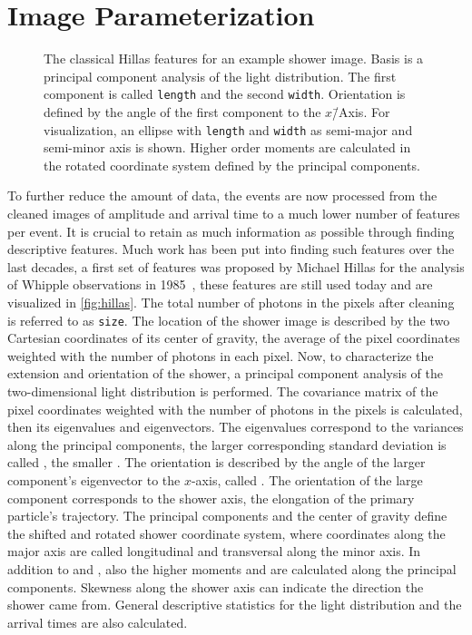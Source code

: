 \section{Image Parameterization}\label{sec:parameters}
\begin{figure}
  \begin{captionbeside}{%
    The classical Hillas features for an example shower image.
    Basis is a principal component analysis of the light distribution. 
    The first component is called \texttt{length} and the second \texttt{width}.
    Orientation is defined by the angle of the first component to the $x$\=/Axis.
    For visualization, an ellipse with \texttt{length} and \texttt{width} as  
    semi-major and semi-minor axis is shown.
    Higher order moments are calculated in the rotated coordinate system defined
    by the principal components.
  }%
  \end{captionbeside}\label{fig:hillas}
\end{figure}
\noindent To further reduce the amount of data,
the events are now processed from the cleaned images of amplitude and arrival time to a much lower number of features per event.
It is crucial to retain as much information as possible through finding 
descriptive features.
Much work has been put into finding such features over the last decades, 
a first set of features was proposed by Michael Hillas for the analysis of Whipple
observations in 1985~\cite{hillas}, these features are still used today and are visualized
in \autoref{fig:hillas}.
The total number of photons in the pixels after cleaning is referred to as \texttt{size}.
The location of the shower image is described by the two Cartesian coordinates of its center of gravity, the average of the pixel coordinates weighted with the number of photons in each pixel.
Now, to characterize the extension and orientation of the shower, a principal component
analysis of the two-dimensional light distribution is performed.
The covariance matrix of the pixel coordinates weighted with the number of photons
in the pixels is calculated, then its eigenvalues and eigenvectors.
The eigenvalues correspond to the variances along the principal components,
the larger corresponding standard deviation is called , the smaller .
The orientation is described by the angle of the larger component's eigenvector 
to the $x$-axis, called .
The orientation of the large component corresponds to the shower axis,
the elongation of the primary particle's trajectory.
The principal components and the center of gravity define the shifted and rotated shower coordinate system,
where coordinates along the major axis are called longitudinal and transversal along the minor axis.  
In addition to  and ,
also the higher moments  and  are calculated
along the principal components.
Skewness along the shower axis can indicate the direction the shower came from.
General descriptive statistics for the light distribution and the arrival times
are also calculated.

